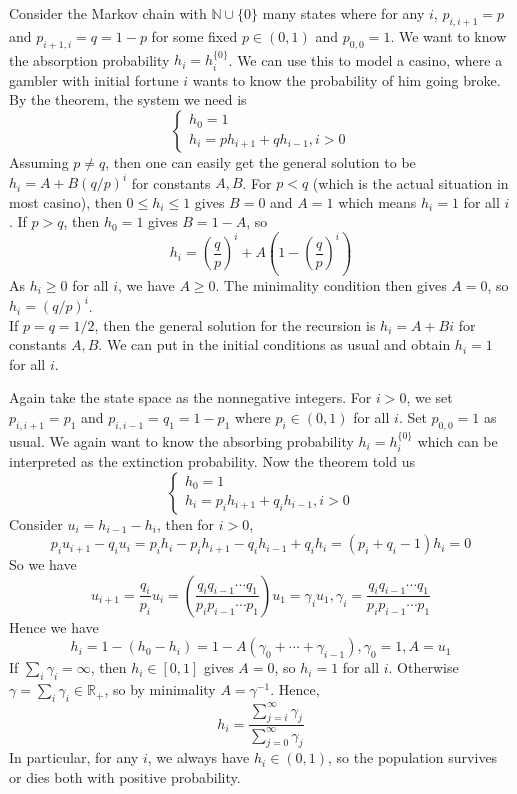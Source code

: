 \begin{example}
    Consider the Markov chain with $\mathbb N\cup\{0\}$ many states where for any $i$, $p_{i,i+1}=p$ and $p_{i+1,i}=q=1-p$ for some fixed $p\in(0,1)$ and $p_{0,0}=1$.
    We want to know the absorption probability $h_i=h_i^{\{0\}}$.
    We can use this to model a casino, where a gambler with initial fortune $i$ wants to know the probability of him going broke.
    By the theorem, the system we need is
    $$\begin{cases}
        h_0=1\\
        h_i=ph_{i+1}+qh_{i-1},i>0
    \end{cases}$$
    Assuming $p\neq q$, then one can easily get the general solution to be $h_i=A+B(q/p)^i$ for constants $A,B$.
    For $p<q$ (which is the actual situation in most casino), then $0\le h_i\le 1$ gives $B=0$ and $A=1$ which means $h_i=1$ for all $i$.
    If $p>q$, then $h_0=1$ gives $B=1-A$, so
    $$h_i=\left( \frac{q}{p} \right)^i+A\left( 1-\left( \frac{q}{p} \right)^i \right)$$
    As $h_i\ge 0$ for all $i$, we have $A\ge 0$.
    The minimality condition then gives $A=0$, so $h_i=(q/p)^i$.\\
    If $p=q=1/2$, then the general solution for the recursion is $h_i=A+Bi$ for constants $A,B$.
    We can put in the initial conditions as usual and obtain $h_i=1$ for all $i$.
\end{example}
\begin{example}
    Again take the state space as the nonnegative integers.
    For $i>0$, we set $p_{i,i+1}=p_1$ and $p_{i,i-1}=q_1=1-p_1$ where $p_i\in (0,1)$ for all $i$.
    Set $p_{0,0}=1$ as usual.
    We again want to know the absorbing probability $h_i=h_i^{\{0\}}$ which can be interpreted as the extinction probability.
    Now the theorem told us
    $$\begin{cases}
        h_0=1\\
        h_i=p_ih_{i+1}+q_ih_{i-1},i>0
    \end{cases}$$
    Consider $u_i=h_{i-1}-h_i$, then for $i>0$,
    $$p_iu_{i+1}-q_iu_i=p_ih_i-p_ih_{i+1}-q_ih_{i-1}+q_ih_i=(p_i+q_i-1)h_i=0$$
    So we have
    $$u_{i+1}=\frac{q_i}{p_i}u_i=\left( \frac{q_iq_{i-1}\cdots q_1}{p_ip_{i-1}\cdots p_1} \right)u_1=\gamma_iu_1,\gamma_i=\frac{q_iq_{i-1}\cdots q_1}{p_ip_{i-1}\cdots p_1}$$
    Hence we have
    $$h_i=1-(h_0-h_i)=1-A(\gamma_0+\cdots +\gamma_{i-1}),\gamma_0=1,A=u_1$$
    If $\sum_i\gamma_i=\infty$, then $h_i\in [0,1]$ gives $A=0$, so $h_i=1$ for all $i$.
    Otherwise $\gamma=\sum_i\gamma_i\in\mathbb R_+$, so by minimality $A=\gamma^{-1}$.
    Hence,
    $$h_i=\frac{\sum_{j=i}^\infty\gamma_j}{\sum_{j=0}^\infty\gamma_j}$$
    In particular, for any $i$, we always have $h_i\in (0,1)$, so the population survives or dies both with positive probability.
\end{example}
